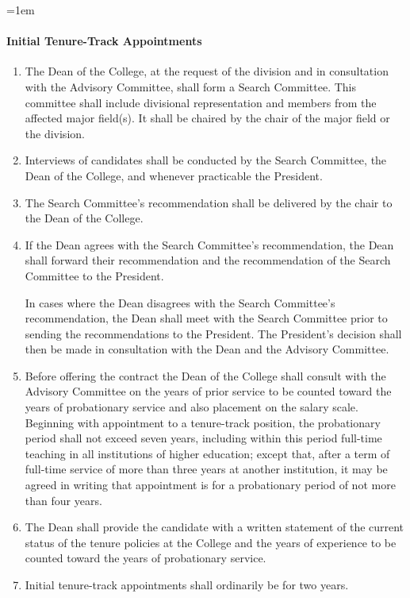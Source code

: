 \documentclass{manual}
\let\oldparagraph\paragraph
\renewcommand\paragraph{\leftskip=1em\oldparagraph}
\newcommand{\itemLevelA}{\alph*.}
\newcommand{\itemRefA}{\alph*}
\begin{document}
\paragraph{Initial Tenure-Track Appointments}
\begin{enumerate}[label=\itemLevelA,ref=\itemRefA]

\item The Dean of the College, at the request of the division and in consultation with the Advisory Committee, shall form a Search Committee. This committee shall include divisional representation and members from the affected major field(s). It shall be chaired by the chair of the major field or the division.

\item Interviews of candidates shall be conducted by the Search Committee, the Dean of the College, and whenever practicable the President.

\item The Search Committee's recommendation shall be delivered by the chair to the Dean of the College.

\item If the Dean agrees with the Search Committee's recommendation, the Dean shall forward their recommendation and the recommendation of the Search Committee to the President.

In cases where the Dean disagrees with the Search Committee's recommendation, the Dean shall meet with the Search Committee prior to sending the recommendations to the President. The President's decision shall then be made in consultation with the Dean and the Advisory Committee.

\item Before offering the contract the Dean of the College shall consult with the Advisory Committee on the years of prior service to be counted toward the years of probationary service and also placement on the salary scale. Beginning with appointment to a tenure-track position, the probationary period shall not exceed seven years, including within this period full-time teaching in all institutions of higher education; except that, after a term of full-time service of more than three years at another institution, it may be agreed in writing that appointment is for a probationary period of not more than four years.

\item The Dean shall provide the candidate with a written statement of the current status of the tenure policies at the College and the years of experience to be counted toward the years of probationary service.

\item Initial tenure-track appointments shall ordinarily be for two years.
\end{enumerate}
\end{document}
